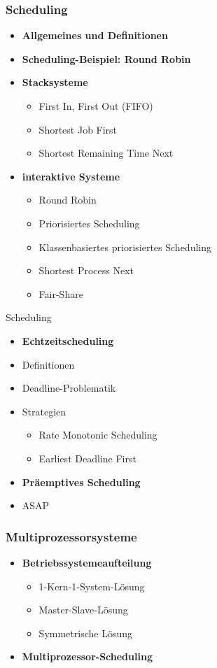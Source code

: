 \begin{frame}
	\frametitle{Scheduling}
	\begin{itemize}
		\item<1-> \textbf{Allgemeines und Definitionen}
		\item<2-> \textbf{Scheduling-Beispiel: Round Robin}
		\item<3-> \textbf{Stacksysteme}
		\begin{itemize}
			\item First In, First Out (FIFO)
			\item Shortest Job First
			\item Shortest Remaining Time Next
		\end{itemize}
		\item<4-> \textbf{interaktive Systeme}
		\begin{itemize}
			\item Round Robin
			\item Priorisiertes Scheduling
			\item Klassenbasiertes priorisiertes Scheduling
			\item Shortest Process Next
			\item Fair-Share
		\end{itemize}
	\end{itemize}
\end{frame}

\begin{frame}{Scheduling}
	\begin{itemize}
		\item<1-> \textbf{Echtzeitscheduling}
		\item<2-> Definitionen
		\item<3-> Deadline-Problematik
		\item<4-> Strategien
		\begin{itemize}
			\item Rate Monotonic Scheduling
			\item Earliest Deadline First
		\end{itemize}
		\item<6-> \textbf{Präemptives Scheduling}
		\item<7-> ASAP
	\end{itemize}
\end{frame}

\begin{frame}
	\frametitle{Multiprozessorsysteme}
	\begin{itemize}
		\item<1-> \textbf{Betriebssystemeaufteilung}
		\begin{itemize}[<+->]
			\item 1-Kern-1-System-Lösung
			\item Master-Slave-Lösung
			\item Symmetrische Lösung
		\end{itemize}
		\item<4-> \textbf{Multiprozessor-Scheduling}
	\end{itemize}
\end{frame}